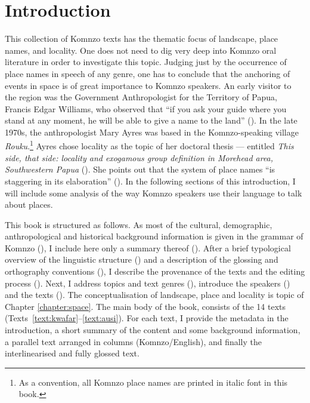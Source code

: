 \section{Introduction}\label{sec:introduction}

This collection of Komnzo texts has the thematic focus of landscape, place names, and locality. One does not need to dig very deep into Komnzo oral literature in order to investigate this topic. Judging just by the occurrence of place names in speech of any genre, one has to conclude that the anchoring of events in space is of great importance to Komnzo speakers. An early visitor to the region was the Government Anthropologist for the Territory of Papua, Francis Edgar Williams, who observed that ``if you ask your guide where you stand at any moment, he will be able to give a name to the land'' (\citeyear[207]{Williams:1936hb}). In the late 1970s, the anthropologist Mary Ayres was based in the Komnzo-speaking village \textit{Rouku}.\footnote{As a convention, all Komnzo place names are printed in italic font in this book.} Ayres chose locality as the topic of her doctoral thesis — entitled \textit{This side, that side: locality and exogamous group definition in Morehead area, Southwestern Papua} (\cite{Ayres:1983dw}). She points out that the system of place names ``is staggering in its elaboration'' (\citeyear[38]{Ayres:1983dw}). In the following sections of this introduction, I will include some analysis of the way Komnzo speakers use their language to talk about places. 

This book is structured as follows. As most of the cultural, demographic, anthropological and historical background information is given in the grammar of Komnzo (\cite[8ff.]{Dohler:2018qt}), I include here only a summary thereof (). After a brief typological overview of the linguistic structure () and a description of the glossing and orthography conventions (), I describe the provenance of the texts and the editing process (). Next, I address topics and text genres (), introduce the speakers () and the texts (). The conceptualisation of landscape, place and locality is topic of Chapter \ref{chapter:space}. The main body of the book, consists of the 14 texts (Texts~\ref{text:kwafar}--\ref{text:ausi}). For each text, I provide the metadata in the introduction, a short summary of the content and some background information, a parallel text arranged in columns (Komnzo/English), and finally the interlinearised and fully glossed text.

